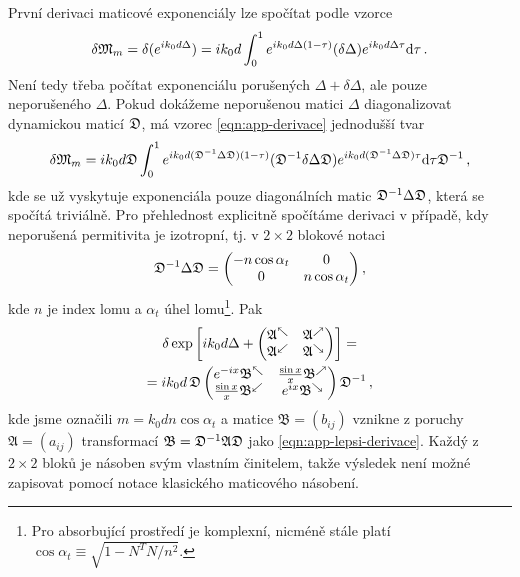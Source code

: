 První derivaci maticové exponenciály lze spočítat podle vzorce\cite{najfeldDerivativesMatrixExponential1995a}
\begin{equation}
    \label{eqn:app-derivace}
    \delta\mathfrak{M}_m = \delta(e^{ik_0d\Delta}) = ik_0d\int_0^1 e^{ik_0d\Delta(1-\tau)} (\delta\Delta) e^{ik_0d\Delta \tau} \textrm{d}\tau \,.
\end{equation}
Není tedy třeba počítat exponenciálu porušených $\Delta+\delta\Delta$, ale pouze neporušeného $\Delta$.
Pokud dokážeme neporušenou matici $\Delta$ diagonalizovat dynamickou maticí $\mathfrak{D}$, má vzorec \eqref{eqn:app-derivace} jednodušší tvar
\begin{equation}
    \label{eqn:app-lepsi-derivace}
    \delta\mathfrak{M}_m = ik_0d \mathfrak{D} \int_0^1 e^{ik_0d (\mathfrak{D}^{-1}\Delta\mathfrak{D})(1-\tau)} (\mathfrak{D}^{-1}\delta\Delta\mathfrak{D}) e^{ik_0d(\mathfrak{D}^{-1}\Delta\mathfrak{D})\tau} \textrm{d}\tau \mathfrak{D}^{-1}\,,
\end{equation}
kde se už vyskytuje exponenciála pouze diagonálních matic $\mathfrak{D}^{-1}\Delta\mathfrak{D}$, která se spočítá triviálně.
Pro přehlednost explicitně spočítáme derivaci v případě, kdy neporušená permitivita je izotropní, tj. v $2\times2$ blokové notaci
\begin{equation}
    \mathfrak{D}^{-1}\Delta\mathfrak{D} = \begin{pmatrix} -n\cos\alpha_t & 0 \\ 0 & n\cos\alpha_t \end{pmatrix} ,
\end{equation}
kde $n$ je index lomu a $\alpha_t$ úhel lomu\footnote{Pro absorbující prostředí je komplexní, nicméně stále platí $\cos\alpha_t\equiv\sqrt{1-N^TN/n^2}$.}.
Pak
\begin{multline}
    \delta \exp \left[ik_0d\Delta+ \begin{pmatrix} 
\mathfrak{A}^\nwarrow & \mathfrak{A}^\nearrow \\
\mathfrak{A}^\swarrow & \mathfrak{A}^\searrow
\end{pmatrix} \right] = \\
= ik_0d \, \mathfrak{D}
\begin{pmatrix} 
    e^{-ix}\mathfrak{B}^\nwarrow & \frac{\sin x}{x}\mathfrak{B}^\nearrow \\
    \frac{\sin x}{x}\mathfrak{B}^\swarrow & e^{ix}\mathfrak{B}^\searrow
\end{pmatrix} \mathfrak{D}^{-1} \,,
\end{multline}
kde jsme označili $m = k_0 d n \cos\alpha_t$ a matice $\mathfrak{B} = (b_{ij})$ vznikne z poruchy $\mathfrak{A} = (a_{ij})$ transformací $\mathfrak{B} = \mathfrak{D}^{-1} \mathfrak{A} \mathfrak{D}$ jako \eqref{eqn:app-lepsi-derivace}.
Každý z $2\times2$ bloků je násoben svým vlastním činitelem, takže výsledek není možné zapisovat pomocí notace klasického maticového násobení.

